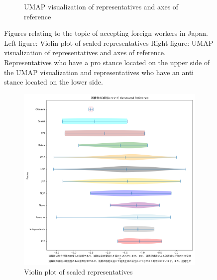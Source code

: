 \documentclass[final,5p,times,twocolumn,authoryear]{elsarticle}
\begin{document}
\begin{figure}[h]
\begin{subfigure}{0.22\textwidth}
      \caption{UMAP visualization of representatives and axes of reference}
    \end{subfigure}
\caption{Figures relating to the topic of accepting foreign workers in Japan. Left figure: Violin plot of scaled representatives Right figure: UMAP visualization of representatives and axes of reference. Representatives who have a pro stance located on the upper side of the UMAP visualization and representatives who have an anti stance located on the lower side.}
\label{fig: results-economy-foreign}
\end{figure}

\begin{figure}[h]
\centering
    \begin{subfigure}{0.22\textwidth}
      \centering
      \includegraphics[width=1\linewidth]{figs/results/economy/consumptiontax_gen_violin_plot.png}
      \caption{Violin plot of scaled representatives}
    \end{subfigure}
    \begin{subfigure}{0.22\textwidth}
      \centering

\end{subfigure}
\end{figure}
\end{document}
